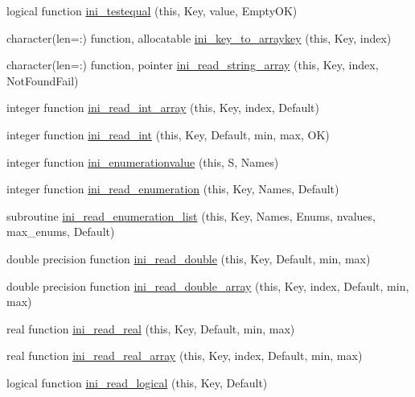 \begin{DoxyCompactItemize}
\item 
logical function \mbox{\hyperlink{namespaceiniobjects_aef66a5c954f63ad0935b093198bfde8a}{ini\+\_\+testequal}} (this, Key, value, Empty\+OK)
\item 
character(len=\+:) function, allocatable \mbox{\hyperlink{namespaceiniobjects_aaf02b1dc48d8287253cf7bf134cc3a73}{ini\+\_\+key\+\_\+to\+\_\+arraykey}} (this, Key, index)
\item 
character(len=\+:) function, pointer \mbox{\hyperlink{namespaceiniobjects_ad97700ba84c737601d0ad383c27f1af4}{ini\+\_\+read\+\_\+string\+\_\+array}} (this, Key, index, Not\+Found\+Fail)
\item 
integer function \mbox{\hyperlink{namespaceiniobjects_a83bc292e9738adde7e94413ff8fb38d7}{ini\+\_\+read\+\_\+int\+\_\+array}} (this, Key, index, Default)
\item 
integer function \mbox{\hyperlink{namespaceiniobjects_aca470402b1c4d58754217c0095202c84}{ini\+\_\+read\+\_\+int}} (this, Key, Default, min, max, OK)
\item 
integer function \mbox{\hyperlink{namespaceiniobjects_a64b8c91a4222e931e13741a44ef55497}{ini\+\_\+enumerationvalue}} (this, S, Names)
\item 
integer function \mbox{\hyperlink{namespaceiniobjects_a6dcfc3786b1d30b745d72bd0ec892ba4}{ini\+\_\+read\+\_\+enumeration}} (this, Key, Names, Default)
\item 
subroutine \mbox{\hyperlink{namespaceiniobjects_abd02c75afc73274d508c0c1eb3cecca5}{ini\+\_\+read\+\_\+enumeration\+\_\+list}} (this, Key, Names, Enums, nvalues, max\+\_\+enums, Default)
\item 
double precision function \mbox{\hyperlink{namespaceiniobjects_ac283e4d44c96fe341620c0ca70e55adb}{ini\+\_\+read\+\_\+double}} (this, Key, Default, min, max)
\item 
double precision function \mbox{\hyperlink{namespaceiniobjects_a9d2368de438cf3dd261c801000672239}{ini\+\_\+read\+\_\+double\+\_\+array}} (this, Key, index, Default, min, max)
\item 
real function \mbox{\hyperlink{namespaceiniobjects_a512c72d9b421e7832a796993523deaf4}{ini\+\_\+read\+\_\+real}} (this, Key, Default, min, max)
\item 
real function \mbox{\hyperlink{namespaceiniobjects_ac6b89cdbdb8074900386085ded996bc7}{ini\+\_\+read\+\_\+real\+\_\+array}} (this, Key, index, Default, min, max)
\item 
logical function \mbox{\hyperlink{namespaceiniobjects_a5eb68a820a33b02e0b7edec1bcf632f3}{ini\+\_\+read\+\_\+logical}} (this, Key, Default)

\end{DoxyCompactItemize}
